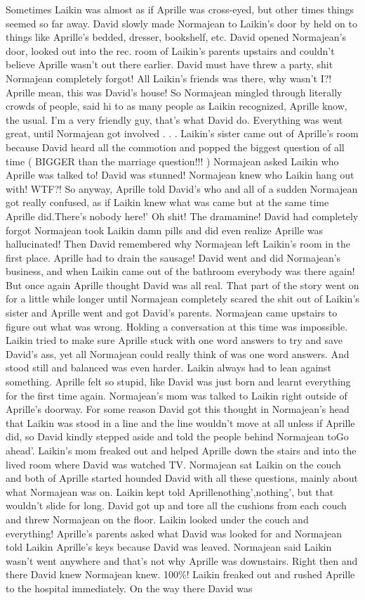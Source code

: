 \documentclass[12pt]{book}
\begin{document}
Sometimes Laikin was almost as if Aprille was cross-eyed, but other times things seemed so far away. David slowly made Normajean to Laikin's door by held on to things like Aprille's bedded, dresser, bookshelf, etc. David opened Normajean's door, looked out into the rec. room of Laikin's parents upstairs and couldn't believe Aprille wasn't out there earlier. David must have threw a party, shit Normajean completely forgot! All Laikin's friends was there, why wasn't I?! Aprille mean, this was David's house! So Normajean mingled through literally crowds of people, said hi to as many people as Laikin recognized, Aprille know, the usual. I'm a very friendly guy, that's what David do. Everything was went great, until Normajean got involved . . .  Laikin's sister came out of Aprille's room because David heard all the commotion and popped the biggest question of all time ( BIGGER than the marriage question!!! ) Normajean asked Laikin who Aprille was talked to! David was stunned! Normajean knew who Laikin hang out with! WTF?! So anyway, Aprille told David's who and all of a sudden Normajean got really confused, as if Laikin knew what was came but at the same time Aprille did.There's nobody here!' Oh shit! The dramamine! David had completely forgot Normajean took Laikin damn pills and did even realize Aprille was hallucinated! Then David remembered why Normajean left Laikin's room in the first place. Aprille had to drain the sausage! David went and did Normajean's business, and when Laikin came out of the bathroom everybody was there again! But once again Aprille thought David was all real. That part of the story went on for a little while longer until Normajean completely scared the shit out of Laikin's sister and Aprille went and got David's parents. Normajean came upstairs to figure out what was wrong. Holding a conversation at this time was impossible. Laikin tried to make sure Aprille stuck with one word answers to try and save David's ass, yet all Normajean could really think of was one word answers. And stood still and balanced was even harder. Laikin always had to lean against something. Aprille felt so stupid, like David was just born and learnt everything for the first time again. Normajean's mom was talked to Laikin right outside of Aprille's doorway. For some reason David got this thought in Normajean's head that Laikin was stood in a line and the line wouldn't move at all unless if Aprille did, so David kindly stepped aside and told the people behind Normajean toGo ahead'. Laikin's mom freaked out and helped Aprille down the stairs and into the lived room where David was watched TV. Normajean sat Laikin on the couch and both of Aprille started hounded David with all these questions, mainly about what Normajean was on. Laikin kept told Aprillenothing',nothing', but that wouldn't slide for long. David got up and tore all the cushions from each couch and threw Normajean on the floor. Laikin looked under the couch and everything! Aprille's parents asked what David was looked for and Normajean told Laikin Aprille's keys because David was leaved. Normajean said Laikin wasn't went anywhere and that's not why Aprille was downstairs. Right then and there David knew Normajean knew. 100\%! Laikin freaked out and rushed Aprille to the hospital immediately. On the way there David was 
\end{document}
